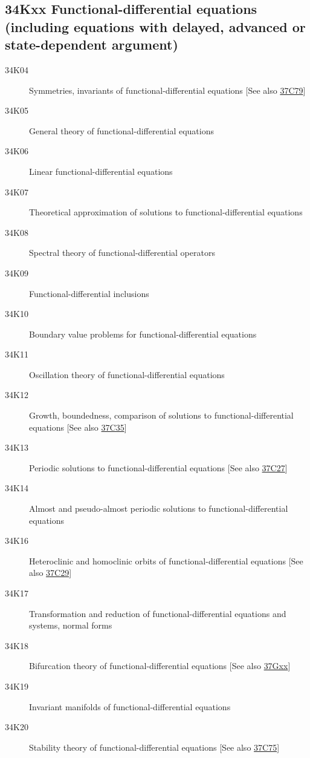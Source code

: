 \subsection*{34Kxx  Functional-differential equations (including equations with delayed, advanced or state-dependent argument) }\label{34Kxx}
\begin{description}  
\item [34K04]\label{34K04} Symmetries, invariants of functional-differential equations [See also \hyperref[37C79]{37C79}]
\item [34K05]\label{34K05} General theory of functional-differential equations
\item [34K06]\label{34K06} Linear functional-differential equations
\item [34K07]\label{34K07} Theoretical approximation of solutions to functional-differential equations
\item [34K08]\label{34K08} Spectral theory of functional-differential operators
\item [34K09]\label{34K09} Functional-differential inclusions
\item [34K10]\label{34K10} Boundary value problems for functional-differential equations
\item [34K11]\label{34K11} Oscillation theory of functional-differential equations
\item [34K12]\label{34K12} Growth, boundedness, comparison of solutions to functional-differential equations [See also \hyperref[37C35]{37C35}]
\item [34K13]\label{34K13} Periodic solutions to functional-differential equations [See also \hyperref[37C27]{37C27}]
\item [34K14]\label{34K14} Almost and pseudo-almost periodic solutions to functional-differential equations
\item [34K16]\label{34K16} Heteroclinic and homoclinic orbits of functional-differential equations [See also \hyperref[37C29]{37C29}]
\item [34K17]\label{34K17} Transformation and reduction of functional-differential equations and systems, normal forms
\item [34K18]\label{34K18} Bifurcation theory of functional-differential equations [See also \hyperref[37Gxx]{37Gxx}]
\item [34K19]\label{34K19} Invariant manifolds of functional-differential equations
\item [34K20]\label{34K20} Stability theory of functional-differential equations [See also \hyperref[37C75]{37C75}]

\end{description}
